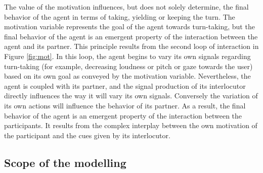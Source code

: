 The value of the motivation influences, but does not solely determine, the final behavior of the agent in terms of taking, yielding or keeping the turn. The motivation variable represents the goal of the agent towards turn-taking, but the final behavior of the agent is an emergent property of the interaction between the agent and its partner. 
This principle results from the second loop of interaction in Figure \ref{fig:mot}. 
In this loop, the agent begins to vary its own signals regarding turn-taking (for example, decreasing loudness or pitch or gaze towards the user) based on its own goal as conveyed by the motivation variable. Nevertheless, the agent is coupled with its partner, and the signal production of its interlocutor directly influences the way it will vary its own signals.
Conversely the variation of its own actions will influence the behavior of its partner. 
As a result, the final behavior of the agent
is an emergent property of the interaction between the participants.
It results from the complex interplay between the own motivation of the participant and the cues given by its interlocutor.

\subsection{Scope of the modelling}

